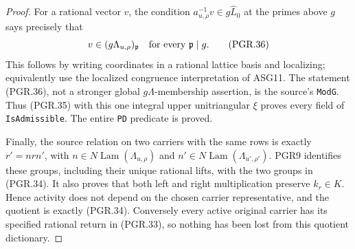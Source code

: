 \begin{proof}
For a rational vector \(v\), the condition
\(a_{u,\rho}^{-1}v\in g\widehat L_0\) at the primes
above \(g\) says precisely that
\[
 v\in(g\Lambda_{u,\rho})_{\mathfrak p}
                         \quad\hbox{for every }\mathfrak p\mid g.
\tag{PGR.36}
\]
This follows by writing coordinates in a rational lattice basis and
localizing; equivalently use the localized congruence interpretation
of ASG11.  The statement (PGR.36), not a stronger global
\(g\Lambda\)-membership assertion, is the source's
\texttt{ModG}.  Thus (PGR.35) with this one integral upper
unitriangular \(\xi\) proves every field of
\texttt{IsAdmissible}.  The entire \texttt{PD} predicate is proved.

Finally, the source relation on two carriers with the same rows is
exactly \(r' = n r n'\), with
\(n\in N\!\operatorname{Lam}(\Lambda_{u,\rho})\) and
\(n'\in N\!\operatorname{Lam}(\Lambda_{u',\rho'})\).
PGR9 identifies these groups, including their unique rational lifts,
with the two groups in (PGR.34).  It also proves that both left and
right multiplication preserve \(k_r\in K\).  Hence activity
does not depend on the chosen carrier representative, and the
quotient is exactly (PGR.34).  Conversely every active original
carrier has its specified rational return in (PGR.33), so nothing
has been lost from this quotient dictionary.
\end{proof}

